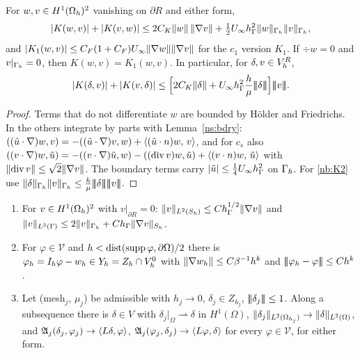 \begin{lemma}\label{nb:K}
For $w,v\in H^1(\Omega_h)^2$ vanishing on $\partial R$ and either form,
\[
|K(w,v)|+|K(v,w)|\le2C_K\lVert w\rVert\,\lVert \nabla v\rVert+\tfrac12U_\infty h_\Gamma^2\lVert w\rVert_{\Gamma_h}\lVert v\rVert_{\Gamma_h},
\]
and $|K_1(w,v)|\le C_F(1+C_F)U_\infty\lVert \nabla w\rVert\lVert \nabla v\rVert$ for the $c_1$ version $K_1$. If $\div w=0$ and $v|_{\Gamma_h}=0$, then $K(w,v)=K_1(w,v)$. In particular, for $\delta,v\in V_h^R$,
\begin{equation}\label{nb:K2}
|K(\delta,v)|+|K(v,\delta)|\le\Bigl[2C_K\norm\delta+U_\infty\hG^2\frac h\mu\tnorm\delta\Bigr]\tnorm v .
\end{equation}
\end{lemma}

\begin{proof}
Terms that do not differentiate $w$ are bounded by H\"older and Friedrichs. In the others integrate by parts with Lemma~\ref{ns:bdry}: $((\tilde u\cdot\nabla)w,v)=-((\tilde u\cdot\nabla)v,w)+\langle (\tilde u\cdot n)w,\, v\rangle$, and for $c_s$ also $((v\cdot\nabla)w,\tilde u)=-((v\cdot\nabla)\tilde u,w)-((\operatorname{div} v)w,\tilde u)+\langle (v\cdot n)w,\, \tilde u\rangle$ with $\lVert \operatorname{div} v\rVert\le\sqrt2\lVert \nabla v\rVert$. The boundary terms carry $|\tilde u|\le\frac14U_\infty h_\Gamma^2$ on $\Gamma_h$. For \eqref{nb:K2} use $\norm\delta_{\Gh}\norm v_{\Gh}\le\frac h\mu\tnorm\delta\tnorm v$.
\end{proof}

\begin{lemma}\label{nb:limit}
\begin{enumerate}[label=(\alph*)]
\item For $v\in H^1(\Omega_h)^2$ with $v|_{\partial R}=0$: $\lVert v\rVert_{L^2(S_h)}\le Ch_\Gamma^{1/2}\lVert \nabla v\rVert$ and $\lVert v\rVert_{L^2(\Gamma)}\le2\lVert v\rVert_{\Gamma_h}+Ch_\Gamma\lVert \nabla v\rVert_{S_h}$.
\item For $\varphi\in\mathcal V$ and $h<\operatorname{dist}(\operatorname{supp}\varphi,\partial\Omega)/2$ there is $\varphi_h=I_h\varphi-w_h\in Y_h=Z_h\cap V_h^0$ with $\lVert \nabla w_h\rVert\le C\beta^{-1}h^k$ and $|\!|\!|\varphi_h-\varphi|\!|\!|\le Ch^k$.
\item Let (mesh$_j$, $\mu_j$) be admissible with $h_j\to0$, $\delta_j\in Z_{h_j}$, $|\!|\!|\delta_j|\!|\!|\le1$. Along a subsequence there is $\delta\in V$ with $\delta_j|_\Omega\rightharpoonup\delta$ in $H^1(\Omega)$, $\lVert \delta_j\rVert_{L^2(\Omega_{h_j})}\to\lVert \delta\rVert_{L^2(\Omega)}$, and $\mathfrak A_j(\delta_j,\varphi_j)\to\langle L\delta,\varphi\rangle$, $\mathfrak A_j(\varphi_j,\delta_j)\to\langle L\varphi,\delta\rangle$ for every $\varphi\in\mathcal V$, for either form.
\end{enumerate}
\end{lemma}

